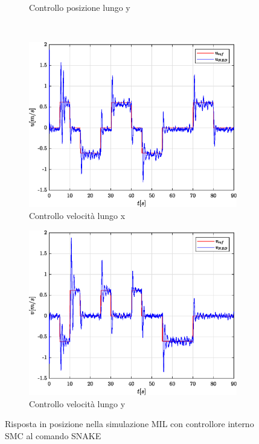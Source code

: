 \begin{figure}
\begin{subfigure}{0.45\textwidth}
		\caption{Controllo posizione lungo y}
	\end{subfigure}
	\\
	\begin{subfigure}{0.45\textwidth}
		\centering
		\includegraphics[width=1\textwidth]{Simulazioni/Figure/SMC/SNAKE_MIL/PositionControlXVel}
		\caption{Controllo velocità lungo x}
	\end{subfigure}
	\hfill
	\begin{subfigure}{0.45\textwidth}
		\centering
		\includegraphics[width=1\textwidth]{Simulazioni/Figure/SMC/SNAKE_MIL/PositionControlYVel}
		\caption{Controllo velocità lungo y}
	\end{subfigure}
	\caption{Risposta in posizione nella simulazione MIL con controllore interno SMC al comando SNAKE}
\end{figure}

